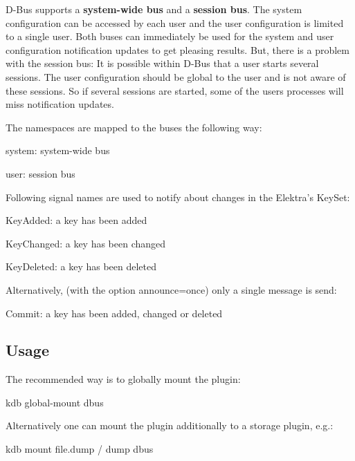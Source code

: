 D-\/\+Bus supports a {\bfseries system-\/wide bus} and a {\bfseries session bus}. The system configuration can be accessed by each user and the user configuration is limited to a single user. Both buses can immediately be used for the system and user configuration notification updates to get pleasing results. But, there is a problem with the session bus\+: It is possible within D-\/\+Bus that a user starts several sessions. The user configuration should be global to the user and is not aware of these sessions. So if several sessions are started, some of the user\textquotesingle{}s processes will miss notification updates.

The namespaces are mapped to the buses the following way\+:


\begin{DoxyItemize}
\item system\+: system-\/wide bus
\item user\+: session bus
\end{DoxyItemize}

Following signal names are used to notify about changes in the Elektra’s Key\+Set\+:


\begin{DoxyItemize}
\item Key\+Added\+: a key has been added
\item Key\+Changed\+: a key has been changed
\item Key\+Deleted\+: a key has been deleted
\end{DoxyItemize}

Alternatively, (with the option announce=once) only a single message is send\+:


\begin{DoxyItemize}
\item Commit\+: a key has been added, changed or deleted
\end{DoxyItemize}

\subsection*{Usage}

The recommended way is to globally mount the plugin\+: \begin{DoxyVerb}kdb global-mount dbus
\end{DoxyVerb}


Alternatively one can mount the plugin additionally to a storage plugin, e.\+g.\+: \begin{DoxyVerb}kdb mount file.dump / dump dbus
\end{DoxyVerb}


